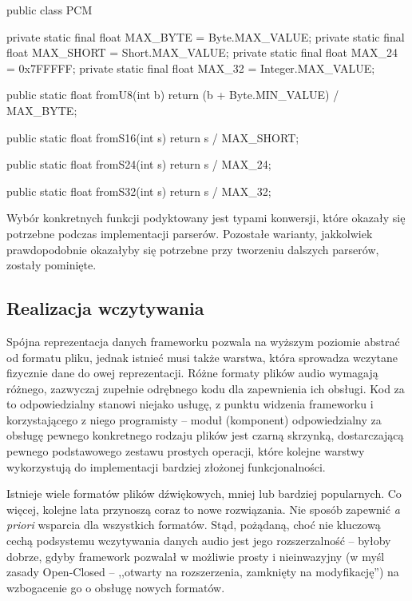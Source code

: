 \begin{java}
public class PCM {

    private static final float MAX_BYTE = Byte.MAX_VALUE;
    private static final float MAX_SHORT = Short.MAX_VALUE;
    private static final float MAX_24 = 0x7FFFFF;
    private static final float MAX_32 = Integer.MAX_VALUE;

    public static float fromU8(int b) {
        return (b + Byte.MIN_VALUE) / MAX_BYTE;
    }

    public static float fromS16(int s) {
        return s / MAX_SHORT;
    }
    
    public static float fromS24(int s) {
        return s / MAX_24;
    }
    
    public static float fromS32(int s) {
        return s / MAX_32;
    }

}
\end{java}

Wybór konkretnych funkcji podyktowany jest typami konwersji, które okazały się potrzebne podczas
implementacji parserów. Pozostałe warianty, jakkolwiek prawdopodobnie okazałyby się potrzebne przy
tworzeniu dalszych parserów, zostały pominięte.


\subsection{Realizacja wczytywania}

Spójna reprezentacja danych frameworku pozwala na wyższym poziomie abstrać od formatu pliku, jednak
istnieć musi także warstwa, która sprowadza wczytane fizycznie dane do owej reprezentacji. Różne
formaty plików audio wymagają różnego, zazwyczaj zupełnie odrębnego kodu dla zapewnienia ich
obsługi. Kod za to odpowiedzialny stanowi niejako usługę, z punktu widzenia frameworku i
korzystającego z niego programisty -- moduł (komponent) odpowiedzialny za obsługę pewnego
konkretnego rodzaju plików jest czarną skrzynką, dostarczającą pewnego podstawowego zestawu prostych
operacji, które kolejne warstwy wykorzystują do implementacji bardziej złożonej funkcjonalności.

Istnieje wiele formatów plików dźwiękowych, mniej lub bardziej popularnych. Co więcej, kolejne lata
przynoszą coraz to nowe rozwiązania. Nie sposób zapewnić \textit{a priori} wsparcia dla wszystkich
formatów. Stąd, pożądaną, choć nie kluczową cechą podsystemu wczytywania danych audio jest jego
rozszerzalność -- byłoby dobrze, gdyby framework pozwalał w możliwie prosty i nieinwazyjny (w myśl
zasady Open-Closed -- ,,otwarty na rozszerzenia, zamknięty na modyfikację'') na wzbogacenie go o
obsługę nowych formatów.

